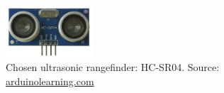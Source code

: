 
\begin{figure}[htbp]
	\centering
	\includegraphics[width=0.29\textwidth]{./figures/hc-sr04.jpg}
	\caption{Chosen ultrasonic rangefinder: HC-SR04. {\footnotesize Source: \url{arduinolearning.com}}}
	\label{fig:hc-sr04}
\end{figure}
